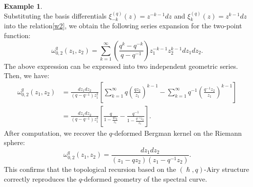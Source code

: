 \documentclass[reqno,11pt]{amsart}
\theoremstyle{plain}
\theoremstyle{definition}
\newtheorem{example}[theorem]{Example}
\theoremstyle{remark}
\numberwithin{equation}{section}
\newcommand{\1}{\mathds{1}}
\newcommand{\2}{\frac{1}{2}}
\begin{document}
{\begin{example}
{\begin{equation}
						\end{equation}
						Substituting the basis differentials $\xi_{-k}^{(q)}(z) = z^{-k-1} dz$ and $\xi_{k}^{(q)}(z) = z^{k-1} dz$ into the relation\eqref{w2}, we obtain the following series expansion for the two-point function:
						\begin{equation}
							\omega^q_{0,2}(z_1, z_2) = \sum_{k=1}^{\infty} \left( \frac{q^k - q^{-k}}{q - q^{-1}} \right) z_1^{-k-1} z_2^{k-1} dz_1 dz_2.
						\end{equation}
						The above expression can be expressed into two independent geometric series. Then, we have:
						\begin{align}
							\omega^q_{0,2}(z_1, z_2) &= \frac{dz_1 dz_2}{(q - q^{-1})z_1^2} \left[ \sum_{k=1}^{\infty} q \left( \frac{q z_2}{z_1} \right)^{k-1} - \sum_{k=1}^{\infty} q^{-1} \left( \frac{q^{-1} z_2}{z_1} \right)^{k-1} \right]\nonumber\\&=\frac{dz_1 dz_2}{(q - q^{-1})z_1^2} \left[ \frac{q}{1 - \frac{qz_2}{z_1}} - \frac{q^{-1}}{1 - \frac{q^{-1}z_2}{z_1}} \right].
						\end{align}
						After computation, we recover the $q$-deformed Bergman kernel on the Riemann sphere:
						\begin{equation}
							\omega^{q}_{0,2}(z_1, z_2) = \frac{dz_1 dz_2}{(z_1 - q z_2)(z_1 - q^{-1} z_2)}.
						\end{equation}
						This confirms that the topological recursion based on the $(\hslash, q)$-Airy structure correctly reproduces the $q$-deformed geometry of the spectral curve.}
				\end{example}
				
}
\end{document}

